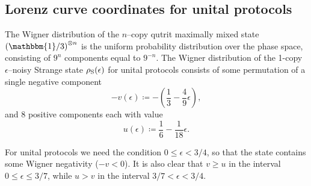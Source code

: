 \documentclass[
twocolumn,
superscriptaddress
]{revtex4-1}
\def\id{\mathbbm{1}}
\begin{document}
\subsection*{Lorenz curve coordinates for unital protocols}

The Wigner distribution of the $n$--copy qutrit maximally mixed state $\left(\id/3\right)^{\otimes n}$ is the uniform probability distribution over the phase space, consisting of $9^n$ components equal to $9^{-n}$.
The Wigner distribution of the 1-copy $\epsilon$--noisy Strange state $\rho_{\rm{S}}(\epsilon)$ for unital protocols consists of some permutation of a single negative component
\begin{equation}
	- v(\epsilon) \coloneqq - \left( \frac{1}{3} -\frac{4}{9}\epsilon \right),
\end{equation} 
and $8$ positive components each with value
\begin{equation}
	u(\epsilon) \coloneqq \frac{1}{6} -\frac{1}{18}\epsilon.
\end{equation}

For unital protocols we need the condition $0 \leq \epsilon < 3/4$, so that the state contains some Wigner negativity ($-v < 0$).
It is also clear that $v \geq u$ in the interval $0 \leq \epsilon \leq 3/7$, while $u > v$ in the interval $3/7 < \epsilon < 3/4$.
\end{document}
